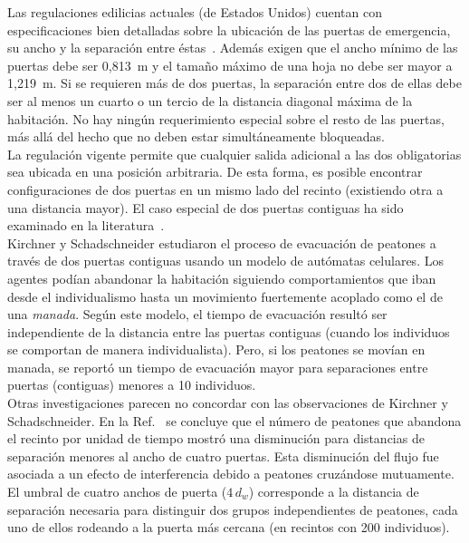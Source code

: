 Las regulaciones edilicias actuales (de Estados Unidos) cuentan con especificaciones bien detalladas sobre la ubicación de las puertas de emergencia, su ancho y la separación entre éstas~\cite{OSHA,FLO}. Además exigen que el ancho mínimo de las puertas debe ser 0,813~m y el tamaño máximo de una hoja no debe ser mayor a 1,219~m\cite{FLO,FLO2}. Si se requieren más de dos puertas, la separación entre dos de ellas debe ser al menos un cuarto o un tercio de la distancia diagonal máxima de la habitación. No hay ningún requerimiento especial sobre el resto de las puertas, más allá del hecho que no deben estar simultáneamente bloqueadas\cite{FLO,FLO2}.\\

\noindent La regulación vigente permite que cualquier salida adicional a las dos obligatorias sea ubicada en una posición arbitraria. De esta forma, es posible encontrar configuraciones de dos puertas en un mismo lado del recinto (existiendo otra a una distancia mayor). El caso especial de dos puertas contiguas ha sido examinado en la literatura~\cite{kirchner1,perez1,daoliang1,huanhuan1}. \\

\noindent Kirchner y Schadschneider estudiaron el proceso de evacuación de peatones a través de dos puertas contiguas usando un modelo de autómatas celulares\cite{kirchner1}. Los agentes podían abandonar la habitación siguiendo comportamientos que iban desde el individualismo hasta un movimiento fuertemente acoplado como el de una \emph{manada}. Según este modelo, el tiempo de evacuación resultó ser independiente de la distancia entre las puertas contiguas (cuando los individuos se comportan de manera individualista). Pero, si los peatones se movían en manada, se reportó un tiempo de evacuación mayor   para separaciones entre puertas (contiguas) menores a 10 individuos.\\

\noindent Otras investigaciones parecen no concordar con las observaciones de Kirchner y Schadschneider. En la Ref.~\cite{perez1} se concluye que el número de peatones que abandona el recinto por unidad de tiempo mostró una disminución para distancias de separación menores al ancho de cuatro puertas. Esta disminución del flujo fue asociada a un efecto de interferencia debido a peatones cruzándose mutuamente. El umbral de cuatro anchos de puerta ($4\,d_w$) corresponde a la distancia de separación necesaria para distinguir dos  grupos independientes de peatones, cada uno de ellos rodeando a la puerta más cercana (en recintos con 200 individuos). \\

